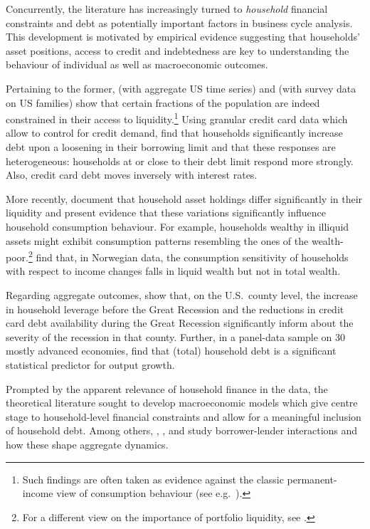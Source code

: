 \documentclass[a4paper,12pt]{article} %
\numberwithin{equation}{section} %
\numberwithin{figure}{section}
\numberwithin{table}{section}
\begin{document}
Concurrently, the literature has increasingly turned to \textit{household} financial constraints and debt as potentially important factors in business cycle analysis. This development is motivated by empirical evidence suggesting that households' asset positions, access to credit and indebtedness are key to understanding the behaviour of individual as well as macroeconomic outcomes. 

Pertaining to the former, \textcite{campbell1989} (with aggregate US time series) and \textcite{zeldes1989} (with survey data on US families) show that certain fractions of the population are indeed constrained in their access to liquidity.\footnote{Such findings are often taken as evidence against the classic permanent-income view of consumption behaviour (see e.g.~\cite{kaplan2014}).} Using granular credit card data which allow to control for credit demand, \textcite{gross2002} find that households significantly increase debt upon a loosening in their borrowing limit and that these responses are heterogeneous: households at or close to their debt limit respond more strongly. Also, credit card debt moves inversely with interest rates. 

More recently, \textcite{kaplan2014} document that household asset holdings differ significantly in their liquidity and present evidence that these variations significantly influence household consumption behaviour. For example, households wealthy in illiquid assets might exhibit consumption patterns resembling the ones of the wealth-poor.\footnote{For a different view on the importance of portfolio liquidity, see \textcite{aguiar2020}.} \textcite{fagereng2021mpc} find that, in Norwegian data, the consumption sensitivity of households with respect to income changes falls in liquid wealth but not in total wealth.

Regarding aggregate outcomes, \textcite{mian2010} show that, on the U.S.~county level, the increase in household leverage before the Great Recession and the reductions in credit card debt availability during the Great Recession significantly inform about the severity of the recession in that county. Further, in a panel-data sample on 30 mostly advanced economies, \textcite{mian2017} find that (total) household debt is a significant statistical predictor for output growth.

Prompted by the apparent relevance of household finance in the data, the theoretical literature sought to develop macroeconomic models which give centre stage to household-level financial constraints and allow for a meaningful inclusion of household debt. Among others, \textcite{egg2012}, \textcite{riosrull2015}, \textcite{justiniano2015} and \textcite{gl2017} study borrower-lender interactions and how these shape aggregate dynamics.
\end{document}
